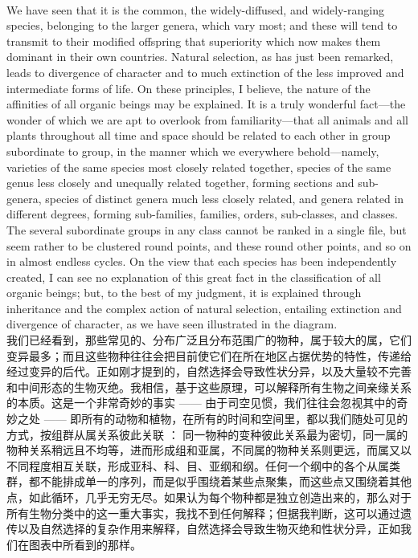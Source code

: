 \documentclass{article}
\begin{document}
\\
We have seen that it is the common, the widely-diffused, and widely-ranging species, belonging to the larger genera, which vary most; and these will tend to transmit to their modified offspring that superiority which now makes them dominant in their own countries. Natural selection, as has just been remarked, leads to divergence of character and to much extinction of the less improved and intermediate forms of life. On these principles, I believe, the nature of the affinities of all organic beings may be explained. It is a truly wonderful fact—the wonder of which we are apt to overlook from familiarity—that all animals and all plants throughout all time and space should be related to each other in group subordinate to group, in the manner which we everywhere behold—namely, varieties of the same species most closely related together, species of the same genus less closely and unequally related together, forming sections and sub-genera, species of distinct genera much less closely related, and genera related in different degrees, forming sub-families, families, orders, sub-classes, and classes. The several subordinate groups in any class cannot be ranked in a single file, but seem rather to be clustered round points, and these round other points, and so on in almost endless cycles. On the view that each species has been independently created, I can see no explanation of this great fact in the classification of all organic beings; but, to the best of my judgment, it is explained through inheritance and the complex action of natural selection, entailing extinction and divergence of character, as we have seen illustrated in the diagram.\\
我们已经看到，那些常见的、分布广泛且分布范围广的物种，属于较大的属，它们变异最多；而且这些物种往往会把目前使它们在所在地区占据优势的特性，传递给经过变异的后代。正如刚才提到的，自然选择会导致性状分异，以及大量较不完善和中间形态的生物灭绝。我相信，基于这些原理，可以解释所有生物之间亲缘关系的本质。这是一个非常奇妙的事实 —— 由于司空见惯，我们往往会忽视其中的奇妙之处 —— 即所有的动物和植物，在所有的时间和空间里，都以我们随处可见的方式，按组群从属关系彼此关联 ： 同一物种的变种彼此关系最为密切，同一属的物种关系稍远且不均等，进而形成组和亚属，不同属的物种关系则更远，而属又以不同程度相互关联，形成亚科、科、目、亚纲和纲。任何一个纲中的各个从属类群，都不能排成单一的序列，而是似乎围绕着某些点聚集，而这些点又围绕着其他点，如此循环，几乎无穷无尽。如果认为每个物种都是独立创造出来的，那么对于所有生物分类中的这一重大事实，我找不到任何解释；但据我判断，这可以通过遗传以及自然选择的复杂作用来解释，自然选择会导致生物灭绝和性状分异，正如我们在图表中所看到的那样。 
\end{document}
